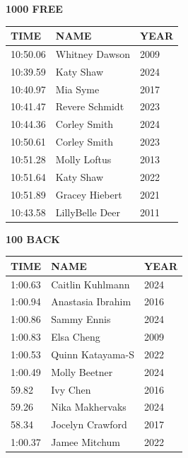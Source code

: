 \begin{table}[H]
\centering
\begin{minipage}[t]{0.48\textwidth}
\centering
\textbf{1000 FREE}\\[0.1cm]
\begin{tabular}{@{}p{1.8cm}p{2.8cm}p{1.2cm}@{}}
\hline
    \textbf{TIME} & \textbf{NAME} & \textbf{YEAR} \\
\hline
    10:50.06 & Whitney Dawson & 2009 \\
    10:39.59 & Katy Shaw & 2024 \\
    10:40.97 & Mia Syme & 2017 \\
    10:41.47 & Revere Schmidt & 2023 \\
    10:44.36 & Corley Smith & 2024 \\
    10:50.61 & Corley Smith & 2023 \\
    10:51.28 & Molly Loftus & 2013 \\
    10:51.64 & Katy Shaw & 2022 \\
    10:51.89 & Gracey Hiebert & 2021 \\
    10:43.58 & LillyBelle Deer & 2011 \\
\hline
\end{tabular}
\end{minipage}\hfill
\begin{minipage}[t]{0.48\textwidth}
\centering
\textbf{100 BACK}\\[0.1cm]
\begin{tabular}{@{}p{1.8cm}p{2.8cm}p{1.2cm}@{}}
\hline
    \textbf{TIME} & \textbf{NAME} & \textbf{YEAR} \\
\hline
    1:00.63 & Caitlin Kuhlmann & 2024 \\
    1:00.94 & Anastasia Ibrahim & 2016 \\
    1:00.86 & Sammy Ennis & 2024 \\
    1:00.83 & Elsa Cheng & 2009 \\
    1:00.53 & Quinn Katayama-S & 2022 \\
    1:00.49 & Molly Beetner & 2024 \\
    59.82 & Ivy Chen & 2016 \\
    59.26 & Nika Makhervaks & 2024 \\
    58.34 & Jocelyn Crawford & 2017 \\
    1:00.37 & Jamee Mitchum & 2022 \\
\hline
\end{tabular}
\end{minipage}
\end{table}

